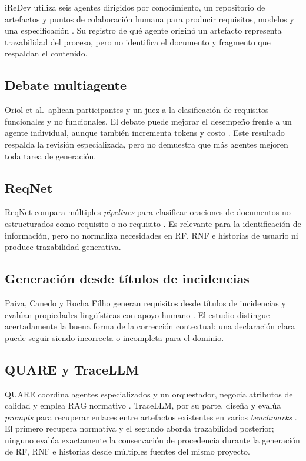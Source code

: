 iReDev utiliza seis agentes dirigidos por conocimiento, un repositorio de artefactos y puntos de colaboración humana para producir requisitos, modelos y una especificación \cite{iredev2025}. Su registro de qué agente originó un artefacto representa trazabilidad del proceso, pero no identifica el documento y fragmento que respaldan el contenido.

\subsection{Debate multiagente}

Oriol et al.\ aplican participantes y un juez a la clasificación de requisitos funcionales y no funcionales. El debate puede mejorar el desempeño frente a un agente individual, aunque también incrementa tokens y costo \cite{oriol2025}. Este resultado respalda la revisión especializada, pero no demuestra que más agentes mejoren toda tarea de generación.

\subsection{ReqNet}

ReqNet compara múltiples \emph{pipelines} para clasificar oraciones de documentos no estructurados como requisito o no requisito \cite{reqnet2026}. Es relevante para la identificación de información, pero no normaliza necesidades en RF, RNF e historias de usuario ni produce trazabilidad generativa.

\subsection{Generación desde títulos de incidencias}

Paiva, Canedo y Rocha Filho generan requisitos desde títulos de incidencias y evalúan propiedades lingüísticas con apoyo humano \cite{paiva2026}. El estudio distingue acertadamente la buena forma de la corrección contextual: una declaración clara puede seguir siendo incorrecta o incompleta para el dominio.

\subsection{QUARE y TraceLLM}

QUARE coordina agentes especializados y un orquestador, negocia atributos de calidad y emplea RAG normativo \cite{quare2026}. TraceLLM, por su parte, diseña y evalúa \emph{prompts} para recuperar enlaces entre artefactos existentes en varios \emph{benchmarks} \cite{tracellm2026}. El primero recupera normativa y el segundo aborda trazabilidad posterior; ninguno evalúa exactamente la conservación de procedencia durante la generación de RF, RNF e historias desde múltiples fuentes del mismo proyecto.

